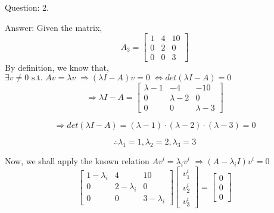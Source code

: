 \documentclass[a4paper]{article}
\begin{document}
\begin{qalist}
		\item[Question: 2.] \setcounter{equation}{0}
		\item[Answer:] Given the matrix, 
			\begin{equation}
				{A}_{3} = \begin{bmatrix} 1 & 4 & 10 \\ 0 & 2 & 0 \\ 0 & 0 & 3\end{bmatrix}
			\end{equation}
			By definition, we know that, $\exists v \neq 0 \text{ s.t. } Av = \lambda v \; \Rightarrow (\lambda I - A) v = 0 \; \Leftrightarrow det(\lambda I - A) = 0$ 
			\begin{equation}
				\Rightarrow \lambda I - A = \begin{bmatrix}\lambda-1 & -4 & -10 \\ 0 & \lambda - 2 & 0 \\ 0 & 0 & \lambda -3\end{bmatrix}
			\end{equation}
			
			\begin{equation}
				\Rightarrow det(\lambda I - A) = (\lambda - 1)\cdot(\lambda - 2)\cdot(\lambda - 3) = 0
			\end{equation}
						
			\begin{equation}
				\therefore {\lambda}_{1} = 1, {\lambda}_{2} = 2 , {\lambda}_{3} = 3
			\end{equation}
			
			Now, we shall apply the known relation $A{v}^{i} = {\lambda}_{i}{v}^{i}$ $\Rightarrow (A - {\lambda}_{i}I){v}^{i} = 0$ 
			\begin{equation} \label{eq:q2eigVecEqn}
				\begin{bmatrix}1 - {\lambda}_{i} & 4 & 10 \\ 0 & 2 - {\lambda}_{i} & 0 \\ 0 & 0 & 3 - {\lambda}_{i}\end{bmatrix} 
				\begin{bmatrix}{v}^{i}_{1} \\ {v}^{i}_{2} \\ {v}^{i}_{3}\end{bmatrix} = 
				\begin{bmatrix}0 \\ 0 \\ 0\end{bmatrix}
			\end{equation}
			

\end{qalist}
\end{document}
